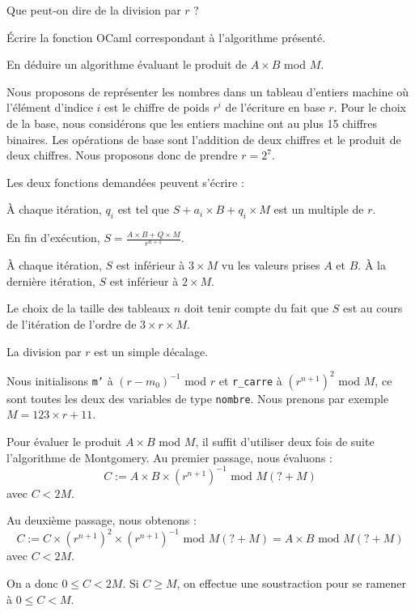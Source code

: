 Que peut-on dire de la division par $r$ ?
\medskip

Écrire la fonction OCaml correspondant à l'algorithme présenté.

\Q
En déduire un algorithme évaluant le produit de $A \times B$ mod $M$.

\Corrige

\Q
Nous proposons de représenter les nombres dans un tableau d'entiers machine où l'élément d'indice $i$ est le chiffre de poids $r^i$ de l'écriture en base $r$. Pour le choix de la base, nous considérons que les entiers machine ont au plus 15 chiffres binaires. Les opérations de base sont l'addition de deux chiffres et le produit de deux chiffres. Nous proposons donc de prendre $r=2^7$.
\medskip

Les deux fonctions demandées peuvent s'écrire :



\Q
À chaque itération, $q_i$ est tel que $S + a_i \times B + q_i \times M$ est un multiple de $r$.
\medskip

En fin d'exécution, $S=\frac{A \times B + Q \times M}{r^{n+1}}$.
\medskip

À chaque itération, $S$ est inférieur à $3\times M$ vu les valeurs prises $A$ et $B$. À la dernière itération, $S$ est inférieur à $2 \times M$.
\medskip

Le choix de la taille des tableaux $n$ doit tenir compte du fait que $S$ est au cours de l'itération de l'ordre de $3 \times r \times M$.
\medskip

La division par $r$ est un simple décalage.
\medskip

Nous initialisons \texttt{m'} à $(r-m_0)^{-1}$ mod $r$ et \texttt{r\_carre} à $(r^{n+1})^2$ mod $M$, ce sont toutes les deux des variables de type \texttt{nombre}. Nous prenons par exemple $M=123 \times r + 11$.



\Q
Pour évaluer le produit $A \times B$ mod $M$, il suffit d'utiliser deux fois de suite l'algorithme de Montgomery. Au premier passage, nous évaluons :
\[
    C := A \times B \times (r^{n+1})^{-1} \textrm{ mod } M(? + M)
\]
avec $C < 2M$.
\medskip

Au deuxième passage, nous obtenons :
\[
    C := C \times (r^{n+1})^2 \times (r^{n+1})^{-1} \textrm{ mod } M(? + M) = A \times B \textrm{ mod } M(? + M)
\]
avec $C < 2M$.
\medskip

On a donc $0 \leq C < 2M$. Si $C \geq M$, on effectue une soustraction pour se ramener à $0 \leq C < M$.



\Fin
